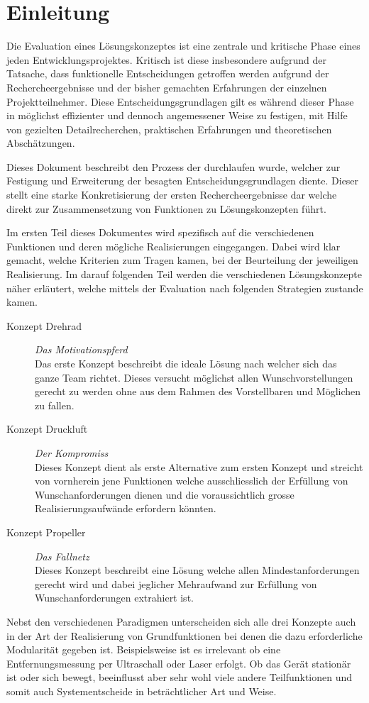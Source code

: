 \section{Einleitung}

Die Evaluation eines Lösungskonzeptes ist eine zentrale und kritische Phase
eines jeden Entwicklungsprojektes. Kritisch ist diese insbesondere aufgrund 
der Tatsache, dass funktionelle Entscheidungen getroffen werden aufgrund der
Rechercheergebnisse und der bisher gemachten Erfahrungen der einzelnen 
Projektteilnehmer. Diese Entscheidungsgrundlagen gilt es während dieser Phase
in möglichst effizienter und dennoch angemessener Weise zu festigen, mit Hilfe
von gezielten Detailrecherchen, praktischen Erfahrungen und theoretischen
Abschätzungen.

Dieses Dokument beschreibt den Prozess der durchlaufen wurde, welcher zur 
Festigung und Erweiterung der besagten Entscheidungsgrundlagen diente. Dieser
stellt eine starke Konkretisierung der ersten Rechercheergebnisse dar welche
direkt zur Zusammensetzung von Funktionen zu Lösungskonzepten führt. 

Im ersten Teil dieses Dokumentes wird spezifisch auf die verschiedenen
Funktionen und deren mögliche Realisierungen eingegangen. Dabei wird klar 
gemacht, welche Kriterien zum Tragen kamen, bei der Beurteilung der jeweiligen
Realisierung. Im darauf folgenden Teil werden die verschiedenen 
Lösungskonzepte näher erläutert, welche mittels der Evaluation nach folgenden
Strategien zustande kamen.

\begin{description}
	\item[Konzept Drehrad] \emph{Das Motivationspferd} \\
		Das erste Konzept beschreibt die ideale Lösung nach welcher
		sich das ganze Team richtet. Dieses versucht möglichst allen
		Wunschvorstellungen gerecht zu werden ohne aus dem Rahmen
		des Vorstellbaren und Möglichen zu fallen.
	\item[Konzept Druckluft] \emph{Der Kompromiss} \\
		Dieses Konzept dient als erste Alternative zum ersten Konzept
		und streicht von vornherein jene Funktionen welche 
		ausschliesslich der Erfüllung von Wunschanforderungen dienen
		und die voraussichtlich grosse Realisierungsaufwände 
		erfordern könnten.
	\item[Konzept Propeller] \emph{Das Fallnetz} \\
		Dieses Konzept beschreibt eine Lösung welche allen 
		Mindestanforderungen gerecht wird und dabei jeglicher 
		Mehraufwand zur Erfüllung von Wunschanforderungen
		extrahiert ist.
\end{description}

Nebst den verschiedenen Paradigmen unterscheiden sich alle drei Konzepte
auch in der Art der Realisierung von Grundfunktionen bei denen die dazu
erforderliche Modularität gegeben ist. Beispielsweise ist es irrelevant
ob eine Entfernungsmessung per Ultraschall oder Laser erfolgt. Ob das
Gerät stationär ist oder sich bewegt, beeinflusst aber sehr wohl viele 
andere Teilfunktionen und somit auch Systementscheide in beträchtlicher 
Art und Weise.
